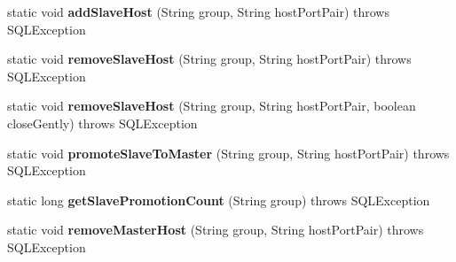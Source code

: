 \begin{DoxyCompactItemize}
\item 
\mbox{\label{classcom_1_1mysql_1_1cj_1_1jdbc_1_1ha_1_1_replication_connection_group_manager_a029338b7bd08d389407cea45a0a57a7a}} 
static void {\bfseries add\+Slave\+Host} (String group, String host\+Port\+Pair)  throws S\+Q\+L\+Exception 
\item 
\mbox{\label{classcom_1_1mysql_1_1cj_1_1jdbc_1_1ha_1_1_replication_connection_group_manager_a32c7e6e4baec6ca377d9831577a8c515}} 
static void {\bfseries remove\+Slave\+Host} (String group, String host\+Port\+Pair)  throws S\+Q\+L\+Exception 
\item 
\mbox{\label{classcom_1_1mysql_1_1cj_1_1jdbc_1_1ha_1_1_replication_connection_group_manager_a1d8eae072a3cf43947463b98c945dd20}} 
static void {\bfseries remove\+Slave\+Host} (String group, String host\+Port\+Pair, boolean close\+Gently)  throws S\+Q\+L\+Exception 
\item 
\mbox{\label{classcom_1_1mysql_1_1cj_1_1jdbc_1_1ha_1_1_replication_connection_group_manager_adf67ffb0a336aecd39b6936be7deaca8}} 
static void {\bfseries promote\+Slave\+To\+Master} (String group, String host\+Port\+Pair)  throws S\+Q\+L\+Exception 
\item 
\mbox{\label{classcom_1_1mysql_1_1cj_1_1jdbc_1_1ha_1_1_replication_connection_group_manager_aa28381ead622a40583691b7ada383e30}} 
static long {\bfseries get\+Slave\+Promotion\+Count} (String group)  throws S\+Q\+L\+Exception 
\item 
\mbox{\label{classcom_1_1mysql_1_1cj_1_1jdbc_1_1ha_1_1_replication_connection_group_manager_a47b69ff67d0b5552beec03a98b4e1d15}} 
static void {\bfseries remove\+Master\+Host} (String group, String host\+Port\+Pair)  throws S\+Q\+L\+Exception 
\item 
\mbox{\label{classcom_1_1mysql_1_1cj_1_1jdbc_1_1ha_1_1_replication_connection_group_manager_a8e92fdde01a589635b9ed2cb4b1e2704}} 

\end{DoxyCompactItemize}
